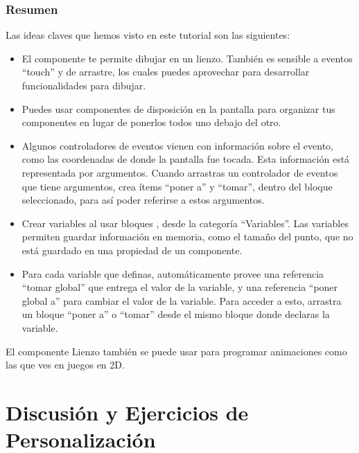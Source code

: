 \subsubsection*{Resumen}

Las ideas claves que hemos visto en este tutorial son las siguientes:

\begin{itemize}

\item El componente  te permite dibujar en un
  lienzo. También es sensible a eventos ``touch'' y de arrastre, los
  cuales puedes aprovechar para desarrollar funcionalidades para
  dibujar.

\item Puedes usar componentes de disposición en la pantalla para
  organizar tus componentes en lugar de ponerlos todos uno debajo del
  otro.

\item Algunos controladores de eventos vienen con información sobre el
  evento, como las coordenadas de donde la pantalla fue tocada. Esta
  información está representada por argumentos. Cuando arrastras un
  controlador de eventos que tiene argumentos, \AppInventor crea ítems
  ``poner a'' y ``tomar'', dentro del bloque seleccionado, para así
  poder referirse a estos argumentos.

\item Crear variables al usar bloques ,
  desde la categoría ``Variables''. Las variables permiten guardar
  información en memoria, como el tamaño del punto, que no está
  guardado en una propiedad de un componente.

\item Para cada variable que definas, \AppInventor automáticamente
  provee una referencia ``tomar global'' que entrega el valor de la
  variable, y una referencia ``poner global a'' para cambiar el valor
  de la variable. Para acceder a esto, arrastra un bloque ``poner a''
  o ``tomar'' desde el mismo bloque donde declaras la variable.
\end{itemize}

El componente Lienzo también se puede usar para programar animaciones
como las que ves en juegos en 2D.

\section{Discusión y Ejercicios de Personalización}

